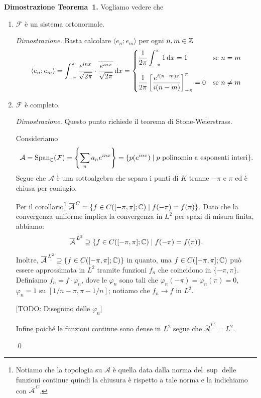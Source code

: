 \textbf{Dimostrazione Teorema~1.}
Vogliamo vedere che
\begin{enumerate}
	\item $\mathcal F$ è un sistema ortonormale.

		\textit{Dimostrazione.}
		Basta calcolare $\langle e_n; e_m \rangle$ per ogni $n, m \in \mathbb Z$
		$$
		\langle e_n; e_m \rangle
		= \int_{-\pi}^\pi \frac{e^{inx}}{\sqrt{2\pi}} \cdot \overline{\frac{e^{inx}}{\sqrt{2\pi}}} \,\mathrm{d} x
		=
		\begin{cases}
			\displaystyle \frac{1}{2\pi} \int_{-\pi}^\pi 1 \,\mathrm{d} x = 1 & \text{se } n = m \\[15pt]
			\displaystyle \frac{1}{2\pi} \left[ \frac{e^{i(n - m)x}}{i(n - m)} \right]_{-\pi}^\pi = 0& \text{se } n \neq m \\
		\end{cases}
		$$

	\item $\mathcal F$ è completo.

		\textit{Dimostrazione.} Questo punto richiede il teorema di Stone-Weierstrass.

		Consideriamo
		$$
			\mathcal A = \operatorname{Span}_\mathbb C(\mathcal F) = \left\{ \sum_n a_n e^{inx} \right\} = \{ p(e^{inx}) \mid p \text{ polinomio a esponenti interi} \}.
		$$
		Segue che $\mathcal A$ è una sottoalgebra che separa i punti di $K$ tranne $-\pi$ e $\pi$ ed è chiusa per coniugio.

		Per il corollario\footnote{Notiamo che la topologia su $\mathcal A$ è quella data dalla norma del $\sup$ delle funzioni continue quindi la chiusura è rispetto a tale norma e la indichiamo con $\overline{\mathcal A}^{\,C}$.} $\overline{\mathcal A}^{\,C} = \{ f \in C([-\pi, \pi]; \mathbb C) \mid f(-\pi) = f(\pi) \}$. Dato che la convergenza uniforme implica la convergenza in $L^2$ per spazi di misura finita, abbiamo:
		$$
			\overline{\mathcal A}^{\,L^2} \supseteq \{ f \in C([-\pi, \pi]; \mathbb C) \mid f(-\pi) = f(\pi) \}.
		$$

		Inoltre, $\overline{\mathcal A}^{\,L^2} \supseteq \{ f \in C([-\pi, \pi]; \mathbb C) \}$ in quanto, una $f \in C([-\pi, \pi]; \mathbb C)$ può essere approssimata in $L^2$ tramite funzioni $f_n$ che coincidono in $\{-\pi,\pi\}$. Definiamo $f_n = f \cdot \varphi_n$, dove le $\varphi_n$ sono tali che $\varphi_n(-\pi) = \varphi_n(\pi) = 0$, $\varphi_n = 1$ su $[1/n - \pi, \pi - 1/n]$; notiamo che $f_n \to f$ in $L^2$.

		[TODO: Disegnino delle $\varphi_n$]

		Infine poiché le funzioni continue sono dense in $L^2$ segue che $\overline{\mathcal A}^{L^2} = L^2$.

\qed
\end{enumerate}


